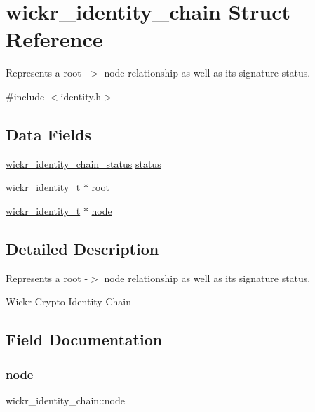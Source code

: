 \hypertarget{structwickr__identity__chain}{}\section{wickr\+\_\+identity\+\_\+chain Struct Reference}
\label{structwickr__identity__chain}


Represents a root -\/$>$ node relationship as well as it\textquotesingle{}s signature status.  




{\ttfamily \#include $<$identity.\+h$>$}

\subsection*{Data Fields}
\begin{DoxyCompactItemize}
\item 
\hyperlink{group__wickr__identity_ga78aefa3835eb13ca75c0129583b5ebfa}{wickr\+\_\+identity\+\_\+chain\+\_\+status} \hyperlink{structwickr__identity__chain_acee365b411eb4a7e7c68c115d60e166e}{status}
\item 
\hyperlink{structwickr__identity}{wickr\+\_\+identity\+\_\+t} $\ast$ \hyperlink{structwickr__identity__chain_a0982b1510591138e2e7d0546741bc6e0}{root}
\item 
\hyperlink{structwickr__identity}{wickr\+\_\+identity\+\_\+t} $\ast$ \hyperlink{structwickr__identity__chain_a4343dae5f1c82057289c26e5c7bb1226}{node}
\end{DoxyCompactItemize}


\subsection{Detailed Description}
Represents a root -\/$>$ node relationship as well as it\textquotesingle{}s signature status. 

Wickr Crypto Identity Chain 

\subsection{Field Documentation}
\mbox{\label{structwickr__identity__chain_a4343dae5f1c82057289c26e5c7bb1226}} 
\subsubsection{\texorpdfstring{node}{node}}
{\footnotesize\ttfamily wickr\+\_\+identity\+\_\+chain\+::node}

